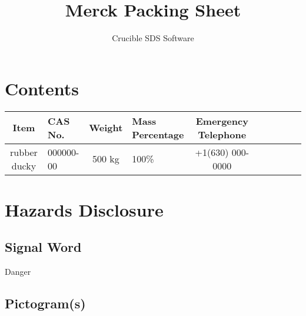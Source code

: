 \documentclass[letterpaper, 11pt]{article}
\title{Merck Packing Sheet}
\author{Crucible SDS Software}
\def\pictGhsExplosive{%
    }
\def\pictGhsFlammable{%
    }
\def\pictGhsOxidizing{%
    }
\def\pictGhsCompressedGas{
    }
\def\pictGhsCorrosive{%
    }
\def\pictGhsToxic{%
    }
\def\pictGhsHarmful{%
    }
\def\pictGhsHealthHazard{%
    }
\def\pictGhsEnvironmentalHazard{%
    }
\begin{document}


\section*{Contents}

\begin{tabular}{Sl|Sl|Sl|Sl|Sl}
    \textbf{Item} & \textbf{CAS No.} & \textbf{Weight} & \textbf{Mass Percentage} & \textbf{Emergency Telephone}\\
    \hline
    rubber ducky & 000000-00 & 500 kg & 100\% & +1(630) 000-0000 \\
\end{tabular}

\section*{Hazards Disclosure}
\subsection*{Signal Word}
Danger
\subsection*{Pictogram(s)}
\pictGhsExplosive
\pictGhsFlammable
\pictGhsOxidizing
\pictGhsCompressedGas
\pictGhsCorrosive
\pictGhsToxic
\pictGhsHarmful
\pictGhsHealthHazard
\pictGhsEnvironmentalHazard
\end{document}
